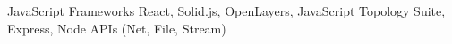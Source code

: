 \cvitem
{
  JavaScript Frameworks
}
{
  React, Solid.js, OpenLayers, JavaScript \mbox{Topology} Suite, Express, Node APIs (Net, File, Stream)
}
